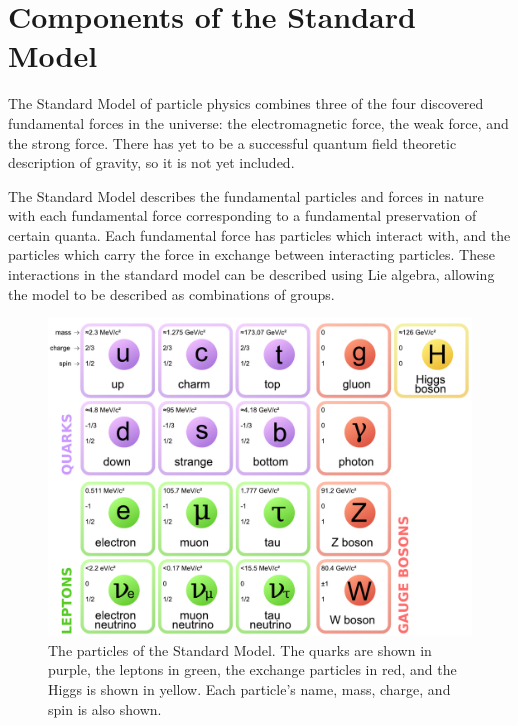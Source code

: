 \section{Components of the Standard Model}
The Standard Model of particle physics combines three of the four discovered fundamental forces in the universe: the electromagnetic force, the weak force, and the strong force.  There has yet to be a successful quantum field theoretic description of gravity, so it is not yet included.

The Standard Model describes the fundamental particles and forces in nature with each fundamental force corresponding to a fundamental preservation of certain quanta. Each fundamental force has particles which interact with, and the particles which carry the force in exchange between interacting particles. These interactions in the standard model can be described using Lie algebra, allowing the model to be described as combinations of groups.

\begin{figure}[!btp]
    \centering
    \includegraphics[width=\textwidth]{figures/standard_model.pdf}
    \caption[Diagram of the particles in the standard model.]
       {The particles of the Standard Model.  The quarks are shown in purple, the leptons in green, the exchange particles in red, and the Higgs is shown in yellow.  Each particle's name, mass, charge, and spin is also shown.}
    \label{fig:ParticleTable}
\end{figure}


